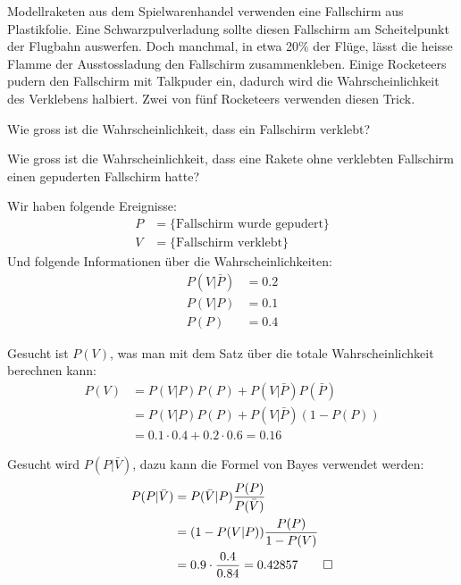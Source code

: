 Modellraketen aus dem Spielwarenhandel verwenden eine Fallschirm aus
Plastikfolie. Eine Schwarzpulverladung sollte diesen Fallschirm am
Scheitelpunkt der Flugbahn auswerfen. Doch manchmal, in etwa 20\%
der Flüge, lässt die heisse
Flamme der Ausstossladung den Fallschirm zusammenkleben. Einige
Rocketeers pudern den Fallschirm mit Talkpuder ein, dadurch wird
die Wahrscheinlichkeit des Verklebens halbiert.
Zwei von fünf Rocketeers verwenden diesen Trick.
\begin{teilaufgaben}
\item Wie gross ist die Wahrscheinlichkeit, dass ein Fallschirm
verklebt?
\item Wie gross ist die Wahrscheinlichkeit, dass eine Rakete
ohne verklebten Fallschirm einen gepuderten Fallschirm hatte?
\end{teilaufgaben}

\begin{loesung}
Wir haben folgende Ereignisse:
\begin{align*}
P&=\{\text{Fallschirm wurde gepudert}\}\\
V&=\{\text{Fallschirm verklebt}\}
\end{align*}
Und folgende Informationen über die Wahrscheinlichkeiten:
\begin{align*}
P(V|\bar P)&=0.2\\
P(V|P)&=0.1\\
P(P)&=0.4
\end{align*}
\begin{teilaufgaben}
\item Gesucht ist $P(V)$, was man mit dem Satz über die totale
Wahrscheinlichkeit berechnen kann:
\begin{align*}
P(V)&=P(V|P)P(P)+P(V|\bar P)P(\bar P)\\
&=P(V|P)P(P)+P(V|\bar P)(1-P(P))\\
&=0.1\cdot 0.4+0.2\cdot 0.6=0.16
\end{align*}
\item Gesucht wird $P(P|\bar V)$, dazu kann die Formel von Bayes verwendet
werden:
\begin{align*}
P(P|\bar V)
&=
P(\bar V |P)\frac{P(P)}{P(\bar V)}
\\
&=(1-P(V|P))\frac{P(P)}{1-P(V)}\\
&=
0.9 \cdot\frac{0.4}{0.84}=0.42857
\qedhere
\end{align*}
\end{teilaufgaben}
\end{loesung}


